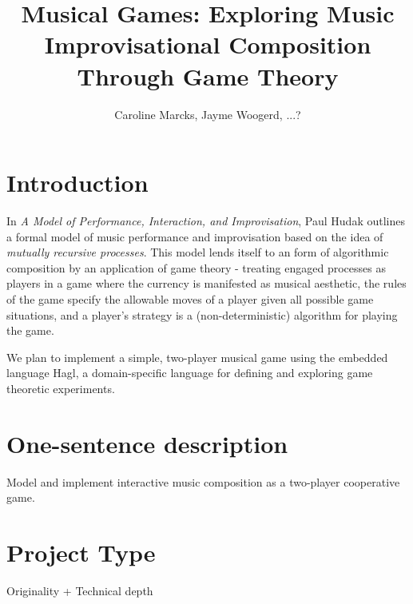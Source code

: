 \documentclass{proc}
\begin{document}
\title{Musical Games: Exploring Music Improvisational Composition Through Game
Theory}

\author{Caroline Marcks, Jayme Woogerd, ...?}

\maketitle

\section{Introduction}

In \emph{A Model of Performance, Interaction, and Improvisation}, Paul Hudak
outlines a formal model of music performance and improvisation based on the idea of  \emph{mutually recursive processes}.  This model lends itself to an form of algorithmic composition by an application of game theory - treating engaged processes as players in a game where the currency is manifested as musical aesthetic, the rules of the game specify the allowable moves of a player given all possible game situations, and a player's strategy is a (non-deterministic) algorithm for playing the game.  

We plan to implement a simple, two-player musical game using the embedded language Hagl, a domain-specific language for defining and exploring game theoretic experiments. 

\section{One-sentence description}

Model and implement interactive music composition as a two-player cooperative game.

\section{Project Type}

Originality + Technical depth 


\end{document}
